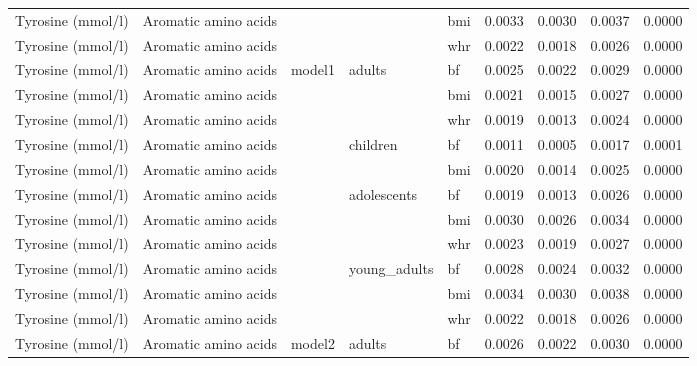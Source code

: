 \documentclass[11pt,twoside]{bristolthesis}
\begin{document}
\begin{longtable}[t]{lllllrrrr}
\cmidrule{4-9}\nopagebreak
Tyrosine (mmol/l) & Aromatic amino acids &  &  & bmi & 0.0033 & 0.0030 & 0.0037 & 0.0000\\
\cmidrule{1-2}
\cmidrule{5-9}\nopagebreak
Tyrosine (mmol/l) & Aromatic amino acids &  &  & whr & 0.0022 & 0.0018 & 0.0026 & 0.0000\\
\cmidrule{1-2}
\cmidrule{5-9}\nopagebreak
Tyrosine (mmol/l) & Aromatic amino acids & \multirow{-11}{*}{\raggedright\arraybackslash model1} & \multirow{-3}{*}{\raggedright\arraybackslash adults} & bf & 0.0025 & 0.0022 & 0.0029 & 0.0000\\
\cmidrule{1-9}\pagebreak[0]
Tyrosine (mmol/l) & Aromatic amino acids &  &  & bmi & 0.0021 & 0.0015 & 0.0027 & 0.0000\\
\cmidrule{1-2}
\cmidrule{5-9}\nopagebreak
Tyrosine (mmol/l) & Aromatic amino acids &  &  & whr & 0.0019 & 0.0013 & 0.0024 & 0.0000\\
\cmidrule{1-2}
\cmidrule{5-9}\nopagebreak
Tyrosine (mmol/l) & Aromatic amino acids &  & \multirow{-3}{*}{\raggedright\arraybackslash children} & bf & 0.0011 & 0.0005 & 0.0017 & 0.0001\\
\cmidrule{1-2}
\cmidrule{4-9}\nopagebreak
Tyrosine (mmol/l) & Aromatic amino acids &  &  & bmi & 0.0020 & 0.0014 & 0.0025 & 0.0000\\
\cmidrule{1-2}
\cmidrule{5-9}\nopagebreak
Tyrosine (mmol/l) & Aromatic amino acids &  & \multirow{-2}{*}{\raggedright\arraybackslash adolescents} & bf & 0.0019 & 0.0013 & 0.0026 & 0.0000\\
\cmidrule{1-2}
\cmidrule{4-9}\nopagebreak
Tyrosine (mmol/l) & Aromatic amino acids &  &  & bmi & 0.0030 & 0.0026 & 0.0034 & 0.0000\\
\cmidrule{1-2}
\cmidrule{5-9}\nopagebreak
Tyrosine (mmol/l) & Aromatic amino acids &  &  & whr & 0.0023 & 0.0019 & 0.0027 & 0.0000\\
\cmidrule{1-2}
\cmidrule{5-9}\nopagebreak
Tyrosine (mmol/l) & Aromatic amino acids &  & \multirow{-3}{*}{\raggedright\arraybackslash young\_adults} & bf & 0.0028 & 0.0024 & 0.0032 & 0.0000\\
\cmidrule{1-2}
\cmidrule{4-9}\nopagebreak
Tyrosine (mmol/l) & Aromatic amino acids &  &  & bmi & 0.0034 & 0.0030 & 0.0038 & 0.0000\\
\cmidrule{1-2}
\cmidrule{5-9}\nopagebreak
Tyrosine (mmol/l) & Aromatic amino acids &  &  & whr & 0.0022 & 0.0018 & 0.0026 & 0.0000\\
\cmidrule{1-2}
\cmidrule{5-9}\nopagebreak
Tyrosine (mmol/l) & Aromatic amino acids & \multirow{-11}{*}{\raggedright\arraybackslash model2} & \multirow{-3}{*}{\raggedright\arraybackslash adults} & bf & 0.0026 & 0.0022 & 0.0030 & 0.0000\\

\end{longtable}
\end{document}
